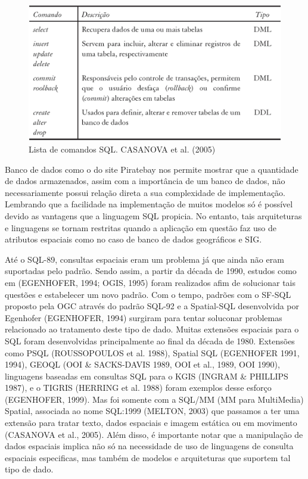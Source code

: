 		\begin{figure}
			\centering
			\includegraphics[width=1\linewidth]{data/comandos_sql}
			\caption{Lista de comandos SQL. CASANOVA et al. (2005)}
			\label{fig:comandossql}
		\end{figure}
		
		Banco de dados como o do site Piratebay nos permite mostrar que a quantidade de dados armazenados, assim com a importância de um banco de dados, não necessariamente possui relação direta a sua complexidade de implementação. Lembrando que a facilidade na implementação de muitos modelos só é possível devido as vantagens que a linguagem SQL propicia. No entanto, tais arquiteturas e linguagens se tornam restritas quando a aplicação em questão faz uso de atributos espaciais como no caso de banco de dados geográficos e SIG.
		
		Até o SQL-89, consultas espaciais eram um problema já que ainda não eram suportadas pelo padrão. Sendo assim, a partir da década de 1990, estudos como em (EGENHOFER, 1994; OGIS, 1995) foram realizados afim de solucionar tais questões e estabelecer um novo padrão. Com o tempo, padrões com o SF-SQL proposto pela OGC através do padrão SQL-92 e a Spatial-SQL desenvolvida por Egenhofer (EGENHOFER, 1994) surgiram para tentar soluconar problemas relacionado ao tratamento deste tipo de dado. Muitas extensões espaciais para o SQL foram desenvolvidas principalmente ao final da década de 1980. Extensões como PSQL (ROUSSOPOULOS et al. 1988), Spatial SQL (EGENHOFER 1991, 1994), GEOQL (OOI \& SACKS-DAVIS 1989, OOI et al., 1989, OOI 1990), linguagens baseadas em consultas SQL para o KGIS (INGRAM \& PHILLIPS 1987), e o TIGRIS (HERRING et al. 1988) foram exemplos desse esforço (EGENHOFER, 1999). Mas foi somente com a SQL/MM (MM para MultiMedia) Spatial, associada ao nome SQL:1999 (MELTON, 2003) que passamos a ter uma extensão para tratar texto, dados espaciais e imagem estática ou em movimento (CASANOVA et al., 2005). Além disso, é importante notar que a manipulação de dados espaciais implica não só na necessidade de uso de linguagens de consulta espaciais especificas, mas também de modelos e arquiteturas que suportem tal tipo de dado.
		
